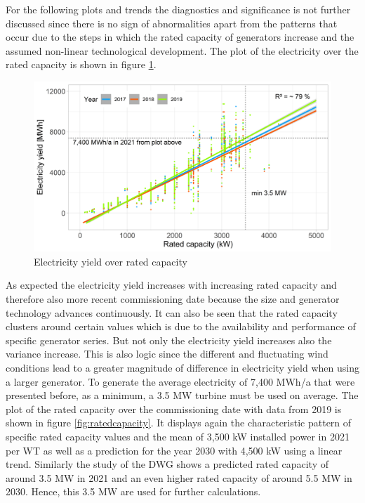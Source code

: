\documentclass[a4paper,11pt]{article}
\begin{document}
For the following plots and trends the diagnostics and significance is not further discussed since there is no sign of abnormalities apart from the patterns that occur due to the steps in which the rated capacity of generators increase and the assumed non-linear technological development. The plot of the electricity over the rated capacity is shown in figure \ref{fig:eratedcapacity}.
\begin{figure}[H]

{\centering \includegraphics[width=1\linewidth]{data/Amprion/results_of_analysis/electricity_rated_capacity} 

}

\caption{Electricity yield over rated capacity}\label{fig:eratedcapacity}
\end{figure}
As expected the electricity yield increases with increasing rated capacity and therefore also more recent commissioning date because the size and generator technology advances continuously. It can also be seen that the rated capacity clusters around certain values which is due to the availability and performance of specific generator series. But not only the electricity yield increases also the variance increase. This is also logic since the different and fluctuating wind conditions lead to a greater magnitude of difference in electricity yield when using a larger generator. To generate the average electricity of 7,400 MWh/a that were presented before, as a minimum, a 3.5 MW turbine must be used on average. The plot of the rated capacity over the commissioning date with data from 2019 is shown in figure \ref{fig:ratedcapacity}. It displays again the characteristic pattern of specific rated capacity values and the mean of 3,500 kW installed power in 2021 per WT as well as a prediction for the year 2030 with 4,500 kW using a linear trend. Similarly the study of the DWG shows a predicted rated capacity of around 3.5 MW in 2021 and an even higher rated capacity of around 5.5 MW in 2030. Hence, this 3.5 MW are used for further calculations.
\end{document}
